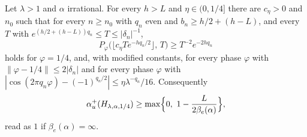 \begin{theorem}\label{thm:quarter}
Let $\lambda>1$ and $\alpha$ irrational. For every $h>L$ and $\eta\in(0,1/4]$ there are $c_\eta>0$ and $n_0$ such that for every $n\ge n_0$ with $q_n$ even and $b_n\ge h/2+(h-L)$, and every $T$ with $e^{(h/2+(h-L))q_n}\le T\le|\delta_n|^{-1}$,
\begin{equation}\label{eq:quarter}
P_\varphi\bigl(\lfloor c_\eta Te^{-hq_n/2}\rfloor,\,T\bigr)\ge T^{-2}e^{-2hq_n}
\end{equation}
holds for $\varphi=1/4$, and, with modified constants, for every phase $\varphi$ with $\|\varphi-1/4\|\le2|\delta_n|$ and for every phase $\varphi$ with $|\cos(2\pi q_n\varphi)-(-1)^{q_n/2}|\le\eta\lambda^{-q_n}/16$. Consequently
\[
\au(H_{\lambda,\alpha,1/4})\ge\max\Bigl\{0,\ 1-\frac{L}{2\beta_e(\alpha)}\Bigr\},
\]
read as $1$ if $\beta_e(\alpha)=\infty$.
\end{theorem}

